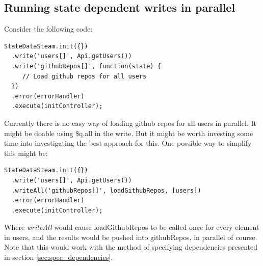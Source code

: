 \documentclass[a4paper,12pt]{article}
\begin{document}
\subsection{Running state dependent writes in parallel}
Consider the following code:
\begin{lstlisting}[caption=Executing the stream, frame=single]
StateDataSteam.init({})
  .write('users[]', Api.getUsers())
  .write('githubRepos[]', function(state) {
     // Load github repos for all users
  })
  .error(errorHandler)
  .execute(initController);
\end{lstlisting}
Currently there is no easy way of loading github repos for all users in parallel. It might be doable using \$q.all in the write. But it might be worth investing some time into investigating 
the best approach for this. One possible way to simplify this might be:

\begin{lstlisting}[caption=Executing the stream, frame=single]
StateDataSteam.init({})
  .write('users[]', Api.getUsers())
  .writeAll('githubRepos[]', loadGithubRepos, [users])
  .error(errorHandler)
  .execute(initController);
\end{lstlisting}
Where \emph{writeAll} would cause loadGithubRepos to be called once for every element in users, and the results would be pushed into githubRepos, in parallel of course.
Note that this would work with the method of specifying dependencies presented in section \ref{sec:spec_dependencies}.
\end{document}
